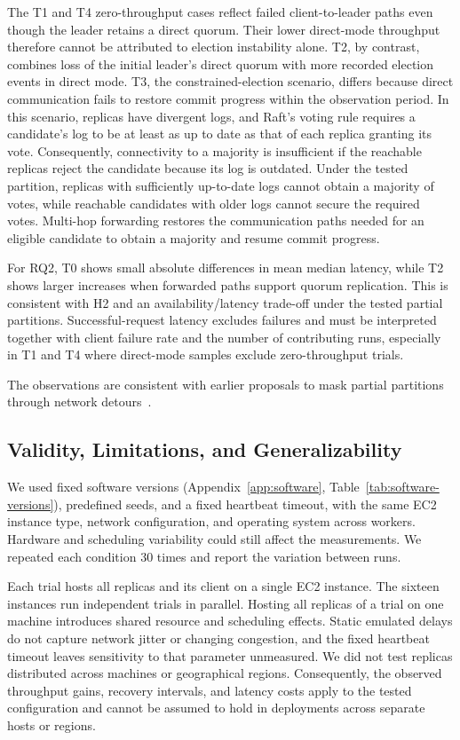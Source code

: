 \documentclass[11pt,a4paper]{article}
\begin{document}
The T1 and T4 zero-throughput cases reflect failed client-to-leader paths even though the leader retains a direct quorum.
Their lower direct-mode throughput therefore cannot be attributed to election instability alone.
T2, by contrast, combines loss of the initial leader's direct quorum with more recorded election events in direct mode.
T3, the constrained-election scenario, differs because direct communication fails to restore commit progress within the observation period. 
In this scenario, replicas have divergent logs, and Raft's voting rule requires a candidate's log to be at least as up to date as that of each replica granting its vote.
Consequently, connectivity to a majority is insufficient if the reachable replicas reject the candidate because its log is outdated. 
Under the tested partition, replicas with sufficiently up-to-date logs cannot obtain a majority of votes, while reachable candidates with older logs cannot secure the required votes.
Multi-hop forwarding restores the communication paths needed for an eligible candidate to obtain a majority and resume commit progress.

For RQ2, T0 shows small absolute differences in mean median latency, while T2 shows larger increases when forwarded paths support quorum replication. 
This is consistent with H2 and an availability/latency trade-off under the tested partial partitions. 
Successful-request latency excludes failures and must be interpreted together with client failure rate and the number of contributing runs, especially in T1 and T4 where direct-mode samples exclude zero-throughput trials.

The observations are consistent with earlier proposals to mask partial partitions through network detours~\cite{jensen2021raft,alfatafta2020nifty,ng2023omnipaxos}.

\subsection{Validity, Limitations, and Generalizability}
We used fixed software versions (Appendix~\ref{app:software}, Table~\ref{tab:software-versions}), predefined seeds, and a fixed heartbeat timeout, with the same EC2 instance type, network configuration, and operating system across workers.
Hardware and scheduling variability could still affect the measurements. We repeated each condition \(30\) times and report the variation between runs.

Each trial hosts all replicas and its client on a single EC2 instance. The sixteen instances run independent trials in parallel.
Hosting all replicas of a trial on one machine introduces shared resource and scheduling effects.
Static emulated delays do not capture network jitter or changing congestion, and the fixed heartbeat timeout leaves sensitivity to that parameter unmeasured.
We did not test replicas distributed across machines or geographical regions.
Consequently, the observed throughput gains, recovery intervals, and latency costs apply to the tested configuration and cannot be assumed to hold in deployments across separate hosts or regions.
\end{document}
